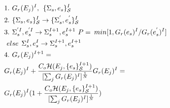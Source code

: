 \documentclass[aps,prl,reprint,superscriptaddress,showkeys]{revtex4-1}
\begin{document}
\begin{equation}
\begin{split}
&1.\hspace{0.125cm} G_{r}(E_j)^I ,\hspace{0.15cm}  \{\Sigma_{s},e_s\}_{\mathcal{S}}^I\\
&2. \hspace{0.125cm}\{\Sigma_{s},e_s\}_{\mathcal{S}}^I \rightarrow  \{\Sigma_{s}^{'},e_s^{'}\}_{\mathcal{S}}^I\\
&3. \hspace{0.125cm} \Sigma_{s}^{'I}, e_s^{'I} \rightarrow \Sigma_{s}^{I+1},e_s^{I+1}   \hspace{0.125cm} P = \hspace{0.075cm} min [1, G_r(e_s)^{I}/G_r(e_s^{'})^{I}]\\
& \hspace{0.125cm}else  \hspace{0.15cm} \Sigma_{s}^I, e_s^I \rightarrow \Sigma_{s}^{I+1}, e_s^{I+1}\\
&4. \hspace{0.125cm} G_{r}(E_j)^{I+1} =  \\
& G_{r}(E_j)^{I} + \frac{C_o \mathcal{H}(E_j,\{e_s\}_{\mathcal{S}}^{I+1}) }{ [\sum_j G_{r}(E_j)^{I}]^{\frac{1}{N} } }G_{r}(E_j)^{I} = \\
& G_{r}(E_j)^{I}( 1 +  \frac{C_o \mathcal{H}(E_j,\{e_s\}_{\mathcal{S}}^{I+1}) }{ [\sum_j G_{r}(E_j)^{I}]^{\frac{1}{N} } } )\\
\end{split}
\label{blender}
\end{equation}
\end{document}
